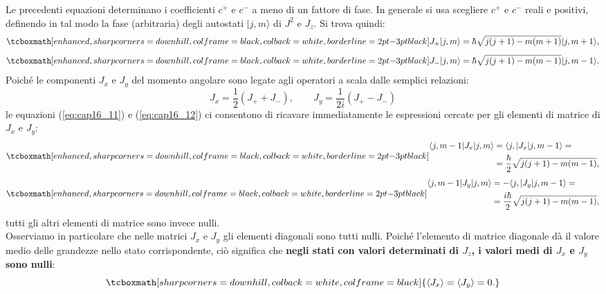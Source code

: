 Le precedenti equazioni determinano i coefficienti $c^+$ e $c^-$ a meno di un fattore di fase. In generale si usa scegliere $c^+$ e $c^-$ reali e positivi, definendo in tal modo la fase (arbitraria) degli autostati $\vert j,m \rangle$ di $J^2$ e $J_z$. Si trova quindi:
	\begin{equation}
		\tcboxmath[enhanced, sharp corners=downhill, colframe=black, colback=white, borderline={2pt}{-3pt}{black}]{
 			J_+\vert j, m \rangle =\hbar \sqrt{j(j+1)-m(m+1)}\vert j, m+1 \rangle ,
 			}
	\label{eq:cap16_11}
	\end{equation}
	\begin{equation}
		\tcboxmath[enhanced, sharp corners=downhill, colframe=black, colback=white, borderline={2pt}{-3pt}{black}]{
			J_-\vert j, m \rangle =\hbar \sqrt{j(j+1)-m(m-1)}\vert j, m-1 \rangle  .
			}
	\label{eq:cap16_12}
	\end{equation}
Poiché le componenti $J_x$ e $J_y$ del momento angolare sono legate agli operatori a scala dalle semplici relazioni:
\begin{equation}
J_x= \frac{1}{2}\left(J_+ + J_-\right),\qquad J_y= \frac{1}{2i}\left(J_+ - J_-\right)
\end{equation}
le equazioni (\ref{eq:cap16_11}) e (\ref{eq:cap16_12}) ci consentono di ricavare immediatamente le espressioni cercate per gli elementi di matrice di $J_x$ e $J_y$:
	\begin{equation}
		\tcboxmath[enhanced, sharp corners=downhill, colframe=black, colback=white, borderline={2pt}{-3pt}{black}]{
		\begin{aligned}
			\langle j, m-1\vert J_x\vert j, m \rangle &=\langle j, \vert J_x\vert j, m-1 \rangle =   \\
			&= \frac{\hbar}{2}\sqrt{j(j+1)-m(m-1)} , 
		\end{aligned}
		}
	\end{equation}
	\begin{equation}
		\tcboxmath[enhanced, sharp corners=downhill, colframe=black, colback=white, borderline={2pt}{-3pt}{black}]{
		\begin{aligned}
			\langle j, m-1\vert J_y\vert j, m \rangle &= -\langle j, \vert J_y\vert j, m-1 \rangle =  \\
			&= \frac{i\hbar}{2}\sqrt{j(j+1)-m(m-1)} , 
		\end{aligned}
		}
	\end{equation}
tutti gli altri elementi di matrice sono invece nulli.\\

Osserviamo in particolare che nelle matrici $J_x$ e $J_y$ gli elementi diagonali sono tutti nulli. Poiché l'elemento di matrice diagonale dà il valore medio delle grandezze nello stato corrispondente, ciò significa che \textbf{negli stati con valori determinati di $J_z$, i valori medi di $J_x$ e $J_y$ sono nulli}:
	\begin{equation}
		\tcboxmath[sharp corners=downhill, colback=white, colframe=black]{
			\langle J_x \rangle = \langle J_y \rangle =0.
		}
	\end{equation}

